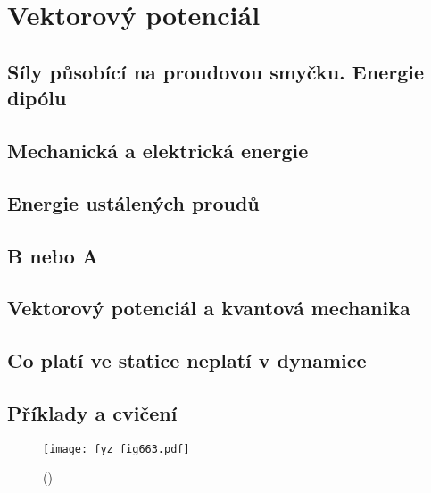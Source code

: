 \chapter{Vektorový potenciál}\label{fyz:IIchaXV}
\minitoc
  \section{Síly působící na proudovou smyčku. Energie dipólu}\label{fyz:IIchaXVsecI}
  \section{Mechanická a elektrická energie}\label{fyz:IIchaXVsecII}
  \section{Energie ustálených proudů}\label{fyz:IIchaXVsecIII}
  \section{B nebo A}\label{fyz:IIchaXVsecIV}
  \section{Vektorový potenciál a kvantová mechanika}\label{fyz:IIchaXVsecV}
  \section{Co platí ve statice neplatí v dynamice}\label{fyz:IIchaXVsecVI}
  \section{Příklady a cvičení}\label{fyz:IIchaXVsecVII}

    \begin{figure}[ht!] %
      \centering
      \texttt{[image: fyz\_fig663.pdf]}
      \caption{
               (\cite[s.~707]{Feynman02})}
      \label{fyz_fig663}
    \end{figure}

